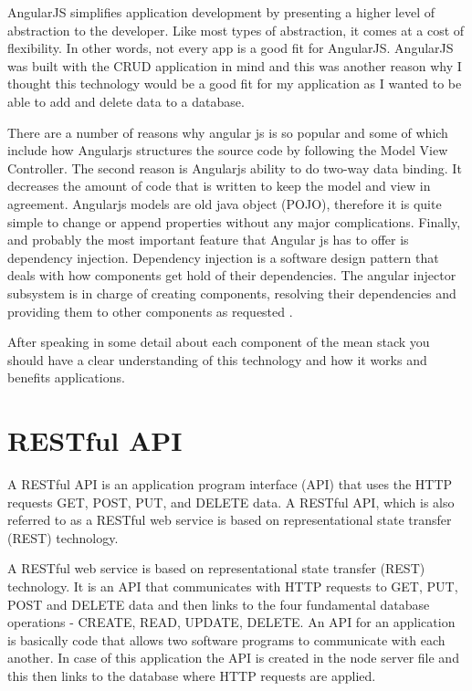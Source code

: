 AngularJS simplifies application development by presenting a higher level of abstraction to the developer. Like most types of abstraction, it comes at a cost of flexibility. In other words, not every app is a good fit for AngularJS. AngularJS was built with the CRUD application in mind and this was another reason why I thought this technology would be a good fit for my application as I wanted to be able to add and delete data to a database. \cite{angularjsa}
 
There are a number of reasons why angular js is so popular and some of which include how Angularjs structures the source code by following
the Model View Controller. The second reason is  Angularjs ability to do two-way data binding. It decreases the amount of code
that is written to keep the model and view in agreement.  Angularjs
models are old java object (POJO), therefore it is quite simple to change or
append properties without any major complications. Finally, and probably the most important
feature that Angular js has to offer is dependency injection. Dependency injection
is a software design pattern that deals with how components get hold of
their dependencies. The angular injector subsystem is in charge of creating components, resolving their dependencies and providing them to other
components as requested \cite{angularjsfeat}.

After speaking in some detail about each component of the mean stack you should have a clear understanding of this technology and how it works and benefits applications.  


\section{RESTful API}
A RESTful API is an application program interface (API) that uses the HTTP requests GET, POST, PUT, and DELETE data. A RESTful API, which is also referred to as a RESTful web service is based on representational state transfer (REST) technology\cite{Restapi}. 

A RESTful web service is based on representational state transfer (REST) technology. It is an API that communicates with HTTP requests to GET, PUT, POST and DELETE data and then links to the four fundamental database operations - CREATE, READ, UPDATE, DELETE. An API for an application is basically code that allows two software programs to communicate with each another. In case of this application the API is created in the node server file and this then links to the database where HTTP requests are applied. 

